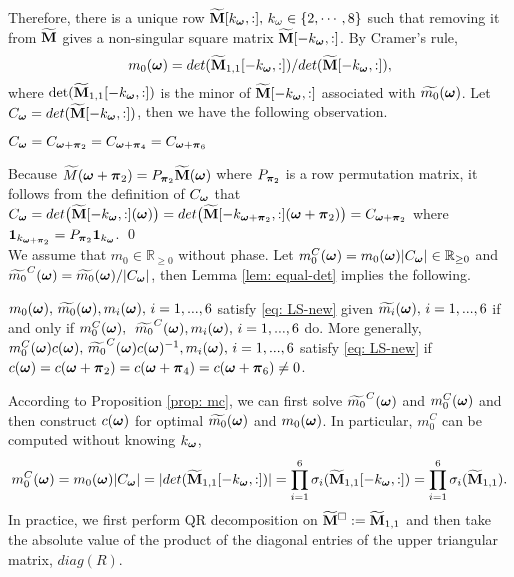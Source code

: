 Therefore, there is a unique row $\widetilde{\mathbf{M}}[k_{\boldsymbol{\omega}},:],\,k_\omega\in\{2,\cdots,8\}$ such that removing it from $\widetilde{\mathbf{M}}$ gives a non-singular square matrix $\widetilde{\mathbf{M}}[-k_{\boldsymbol{\omega}},:]$. By Cramer's rule, $$m_0(\boldsymbol{\omega}) = det(\widetilde{\mathbf{M}}_{1,1}[-k_{\boldsymbol{\omega}},:])/det(\widetilde{\mathbf{M}}[-k_{\boldsymbol{\omega}},:]),$$ where $\det(\widetilde{\mathbf{M}}_{1,1}[-k_{\boldsymbol{\omega}},:])$ is the minor of $\widetilde{\mathbf{M}}[-k_{\boldsymbol{\omega}},:]$ associated with $\widetilde{m_{0}}(\boldsymbol{\omega})$. 
Let $C_{\boldsymbol{\omega}} = det(\widetilde{\mathbf{M}}[-k_{\boldsymbol{\omega}},:])$, then we have the following observation.
\begin{lemma}\label{lem: equal-det}
$C_{\boldsymbol{\omega}} = C_{\boldsymbol{\omega}+\boldsymbol{\pi}_2} = C_{\boldsymbol{\omega}+\boldsymbol{\pi}_4} = C_{\boldsymbol{\omega}+\boldsymbol{\pi}_6}$
\end{lemma}
Because $\widetilde{M}(\boldsymbol{\omega}+\boldsymbol{\pi}_2) = P_{\boldsymbol{\pi}_2}\widetilde{\mathbf{M}}(\boldsymbol{\omega})$ where $P_{\boldsymbol{\pi}_2}$ is a row permutation matrix, it follows from the definition of $C_{\boldsymbol{\omega}}$ that 
$C_{\boldsymbol{\omega}} = det\big(\widetilde{\mathbf{M}}[-k_{\boldsymbol{\omega}},:](\boldsymbol{\omega})\big) = det\big(\widetilde{\mathbf{M}}[-k_{\boldsymbol{\omega}+\boldsymbol{\pi}_2},:](\boldsymbol{\omega}+\boldsymbol{\pi}_2) \big)= C_{\boldsymbol{\omega}+\boldsymbol{\pi}_2}$ where 
$\mathbf{1}_{k_{\boldsymbol{\omega}+\boldsymbol{\pi}_2}} = P_{\boldsymbol{\pi}_2}\mathbf{1}_{k_{\boldsymbol{\omega}}}$.
\qed\\[1em]
We assume that $m_0\in\mathbb{R}_{\geq 0}$ without phase. Let $m_0^C(\boldsymbol{\omega}) = m_0(\boldsymbol{\omega})|C_{\boldsymbol{\omega}}|\in \mathbb{R}_{\geq 0}$ and $\widetilde{m_{0}}^C(\boldsymbol{\omega}) = \widetilde{m_{0}}(\boldsymbol{\omega})/|C_{\boldsymbol{\omega}}|$, then Lemma \ref{lem: equal-det} implies the following.
\begin{proposition}\label{prop: mc}
$m_0(\boldsymbol{\omega}),\,\widetilde{m_{0}}(\boldsymbol{\omega}), m_i(\boldsymbol{\omega}),\,  i = 1,...,6$ satisfy \eqref{eq: LS-new} given $\widetilde{m_{i}}(\boldsymbol{\omega}),\,i=1,...,6$ if and only if $m_0^C(\boldsymbol{\omega}),$ $\,\widetilde{m_{0}}^C(\boldsymbol{\omega}), m_i(\boldsymbol{\omega}),\,i = 1,...,6$ do. More generally, $m_0^C(\boldsymbol{\omega})c(\boldsymbol{\omega}),\,\widetilde{m_{0}}^C(\boldsymbol{\omega})c(\boldsymbol{\omega})^{-1}, m_i(\boldsymbol{\omega}),\,i=1,...,6$ satisfy \eqref{eq: LS-new} if $c(\boldsymbol{\omega}) = c(\boldsymbol{\omega}+\boldsymbol{\pi}_2)=c(\boldsymbol{\omega}+\boldsymbol{\pi}_4) = c(\boldsymbol{\omega}+\boldsymbol{\pi}_6) \neq 0$.
\end{proposition}
According to Proposition \ref{prop: mc}, we can first solve $\widetilde{m_{0}}^C(\boldsymbol{\omega})$ and $m_0^C(\boldsymbol{\omega})$ and then construct $c(\boldsymbol{\omega})$ for optimal $\widetilde{m_{0}}(\boldsymbol{\omega})$ and $m_0(\boldsymbol{\omega})$. 
In particular, $m_0^C$ can be computed without knowing $k_{\boldsymbol{\omega}}$,
\begin{align}\label{eq: m0C}
m_0^C(\boldsymbol{\omega}) = m_0(\boldsymbol{\omega})|C_{\boldsymbol{\omega}}| = |det(\widetilde{\mathbf{M}}_{1,1}[-k_{\boldsymbol{\omega}},:])| = \prod_{i=1}^6\sigma_i(\widetilde{\mathbf{M}}_{1,1}[-k_{\boldsymbol{\omega}},:]) = \prod_{i=1}^6\sigma_i(\widetilde{\mathbf{M}}_{1,1}).
\end{align}
In practice, we first perform QR decomposition on $\widetilde{\mathbf{M}}^{\Box}:=\widetilde{\mathbf{M}}_{1,1}$ and then take the absolute value of the product of the diagonal entries of the upper triangular matrix, $diag(R)$. 
